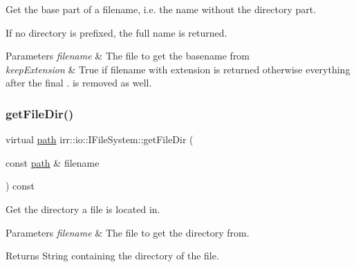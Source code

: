 Get the base part of a filename, i.\+e. the name without the directory part. 

If no directory is prefixed, the full name is returned. 
\begin{DoxyParams}{Parameters}
{\em filename} & The file to get the basename from \\
\hline
{\em keep\+Extension} & True if filename with extension is returned otherwise everything after the final \textquotesingle{}.\textquotesingle{} is removed as well. \\
\hline
\end{DoxyParams}
\mbox{\label{classirr_1_1io_1_1IFileSystem_ad8b7b93f32f58c1ba9a8e7cacd5de80b}} 
\subsubsection{\texorpdfstring{get\+File\+Dir()}{getFileDir()}}
{\footnotesize\ttfamily virtual \hyperlink{namespaceirr_1_1io_ab1bdc45edb3f94d8319c02bc0f840ee1}{path} irr\+::io\+::\+I\+File\+System\+::get\+File\+Dir (\begin{DoxyParamCaption}\item[{const \hyperlink{namespaceirr_1_1io_ab1bdc45edb3f94d8319c02bc0f840ee1}{path} \&}]{filename }\end{DoxyParamCaption}) const\hspace{0.3cm}{\ttfamily [pure virtual]}}



Get the directory a file is located in. 


\begin{DoxyParams}{Parameters}
{\em filename} & The file to get the directory from. \\
\hline
\end{DoxyParams}
\begin{DoxyReturn}{Returns}
String containing the directory of the file. 
\end{DoxyReturn}
\mbox{\label{classirr_1_1io_1_1IFileSystem_acbf7342afa6e2fc9583db3e521e66e61}} 
